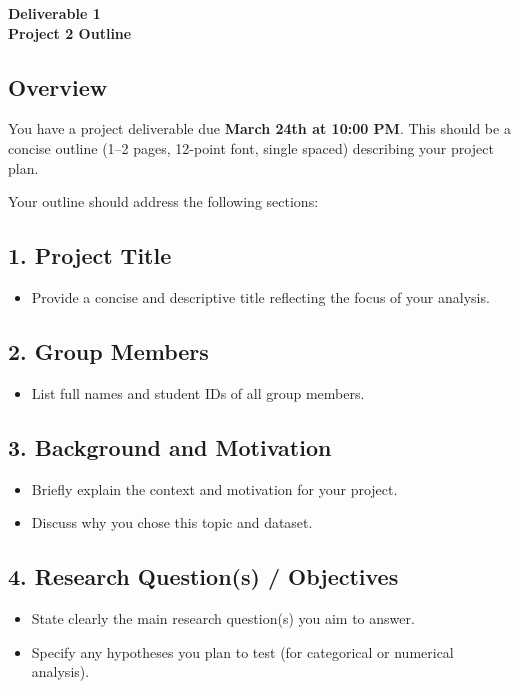 \documentclass[12pt]{article}
\begin{document}
\begin{center}
\textbf{\Large Deliverable 1 \\ Project 2 Outline} 
\end{center}

\subsection*{Overview}

You have a project deliverable due \textbf{March 24th at 10:00 PM}.  
This should be a concise outline (1--2 pages, 12-point font, single spaced) describing your project plan.

Your outline should address the following sections:

\subsection*{1. Project Title}
\begin{itemize}
    \item Provide a concise and descriptive title reflecting the focus of your analysis.
\end{itemize}

\subsection*{2. Group Members}
\begin{itemize}
    \item List full names and student IDs of all group members.
\end{itemize}

\subsection*{3. Background and Motivation}
\begin{itemize}
    \item Briefly explain the context and motivation for your project.
    \item Discuss why you chose this topic and dataset.
\end{itemize}

\subsection*{4. Research Question(s) / Objectives}
\begin{itemize}
    \item State clearly the main research question(s) you aim to answer.
    \item Specify any hypotheses you plan to test (for categorical or numerical analysis).
\end{itemize}
\end{document}
